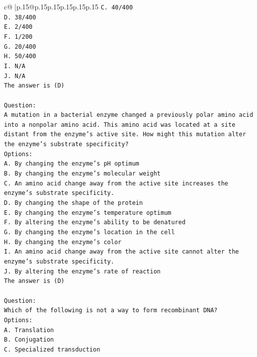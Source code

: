 \documentclass{article}
\begin{document}
{\begin{supertabular}{c@{$\;$}|p{.15\linewidth}@{}p{.15\linewidth}p{.15\linewidth}p{.15\linewidth}p{.15\linewidth}p{.15\linewidth}}
{{{\texttt{C. 40/400} \\
\texttt{D. 38/400} \\
\texttt{E. 2/400} \\
\texttt{F. 1/200} \\
\texttt{G. 20/400} \\
\texttt{H. 50/400} \\
\texttt{I. N/A} \\
\texttt{J. N/A} \\
\texttt{The answer is (D)} \\
\\ 
\texttt{Question:} \\
\texttt{A mutation in a bacterial enzyme changed a previously polar amino acid into a nonpolar amino acid. This amino acid was located at a site distant from the enzyme’s active site. How might this mutation alter the enzyme’s substrate specificity?} \\
\texttt{Options:} \\
\texttt{A. By changing the enzyme’s pH optimum} \\
\texttt{B. By changing the enzyme's molecular weight} \\
\texttt{C. An amino acid change away from the active site increases the enzyme's substrate specificity.} \\
\texttt{D. By changing the shape of the protein} \\
\texttt{E. By changing the enzyme's temperature optimum} \\
\texttt{F. By altering the enzyme's ability to be denatured} \\
\texttt{G. By changing the enzyme’s location in the cell} \\
\texttt{H. By changing the enzyme's color} \\
\texttt{I. An amino acid change away from the active site cannot alter the enzyme’s substrate specificity.} \\
\texttt{J. By altering the enzyme's rate of reaction} \\
\texttt{The answer is (D)} \\
\\ 
\texttt{Question:} \\
\texttt{Which of the following is not a way to form recombinant DNA?} \\
\texttt{Options:} \\
\texttt{A. Translation} \\
\texttt{B. Conjugation} \\
\texttt{C. Specialized transduction} \\
}}}
\end{supertabular}}
\end{document}
